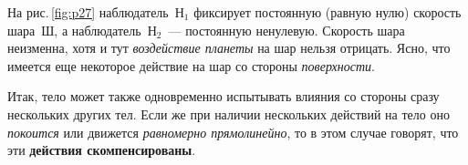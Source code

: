 \documentclass[main.tex]{subfiles}
\begin{document}
На рис.\,\ref{fig:p27} наблюдатель~$\text{Н}_1$ фиксирует постоянную (равную нулю) скорость шара~Ш, а наблюдатель~$\text{Н}_2$~--- постоянную ненулевую. Скорость шара неизменна, хотя и тут \emph{воздействие планеты} на шар нельзя отрицать. Ясно, что имеется еще некоторое действие на шар со стороны \emph{поверхности}. 

Итак, тело может также одновременно испытывать влияния со стороны сразу нескольких других тел. Если же при наличии нескольких действий на тело оно \emph{покоится} или движется \emph{равномерно прямолинейно}, то в этом случае говорят, что эти \textbf{действия скомпенсированы}. 

















 
\end{document}
